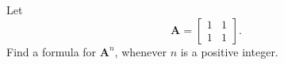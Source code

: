 
%
%
%

	Let
	$$\mathbf{A} = \begin{bmatrix} 1 & 1 \\ 1 & 1 \end{bmatrix}.$$
	Find a formula for $\mathbf{A}^n$,
	whenever $n$ is a positive integer.

\solution
	
